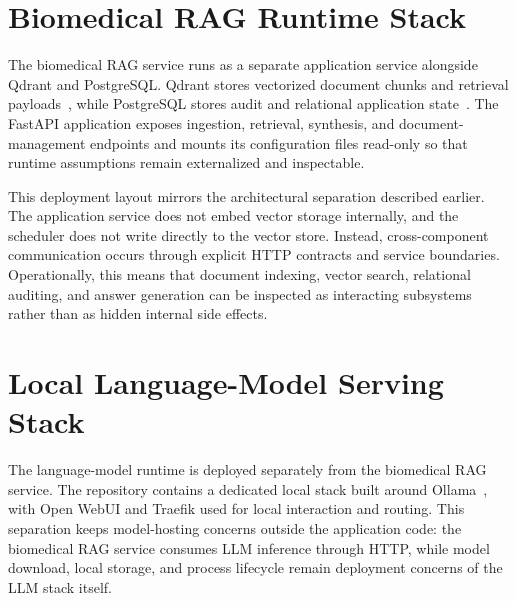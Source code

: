 \section{Biomedical RAG Runtime Stack}

The biomedical RAG service runs as a separate application service alongside Qdrant and PostgreSQL. Qdrant stores vectorized document chunks and retrieval payloads~\cite{qdrant2026collections}, while PostgreSQL stores audit and relational application state~\cite{postgresql2026docs}. The FastAPI application exposes ingestion, retrieval, synthesis, and document-management endpoints and mounts its configuration files read-only so that runtime assumptions remain externalized and inspectable.

This deployment layout mirrors the architectural separation described earlier. The application service does not embed vector storage internally, and the scheduler does not write directly to the vector store. Instead, cross-component communication occurs through explicit HTTP contracts and service boundaries. Operationally, this means that document indexing, vector search, relational auditing, and answer generation can be inspected as interacting subsystems rather than as hidden internal side effects.

\section{Local Language-Model Serving Stack}

The language-model runtime is deployed separately from the biomedical RAG service. The repository contains a dedicated local stack built around Ollama~\cite{ollama2026api}, with Open WebUI and Traefik used for local interaction and routing. This separation keeps model-hosting concerns outside the application code: the biomedical RAG service consumes LLM inference through HTTP, while model download, local storage, and process lifecycle remain deployment concerns of the LLM stack itself.

